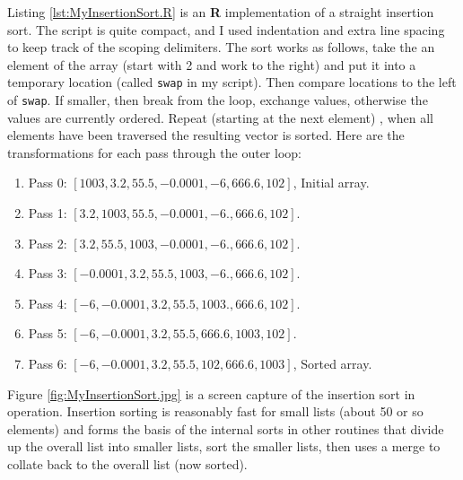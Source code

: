 Listing \ref{lst:MyInsertionSort.R} is an \textbf{R} implementation of a straight insertion sort.  
The script is quite compact, and I used indentation and extra line spacing to keep track of the scoping delimiters.
The sort works as follows, take the an element of the array (start with 2 and work to the right) and put it into a temporary location (called \texttt{swap} in my script).  Then compare locations to the left of \texttt{swap}.  If smaller, then break from the loop, exchange values, otherwise the values are currently ordered. Repeat (starting at the next element) , when all elements have been traversed the resulting vector is sorted.  Here are the transformations for each pass through the outer loop:
\begin{enumerate}
\item Pass 0: $[1003,3.2,55.5,-0.0001,-6,666.6,102]$, Initial array.
\item Pass 1: $[3.2,1003,55.5,-0.0001,-6.,666.6,102]$.
\item Pass 2: $[3.2,55.5,1003,-0.0001,-6.,666.6,102]$.
\item Pass 3: $[-0.0001,3.2,55.5,1003,-6.,666.6,102]$.
\item Pass 4: $[-6,-0.0001,3.2,55.5,1003.,666.6,102]$.
\item Pass 5: $[-6,-0.0001,3.2,55.5,666.6,1003,102]$.
\item Pass 6: $[-6,-0.0001,3.2,55.5,102,666.6,1003]$, Sorted array.
\end{enumerate}
Figure \ref{fig:MyInsertionSort.jpg} is a screen capture of the insertion sort in operation.  
Insertion sorting is reasonably fast for small lists (about 50 or so elements) and forms the basis of the internal sorts in other routines that divide up the overall list into smaller lists, sort the smaller lists, then uses a merge to collate back to the overall list (now sorted).
